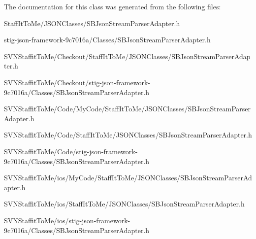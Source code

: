 \-The documentation for this class was generated from the following files\-:\begin{DoxyCompactItemize}
\item 
\-Staff\-It\-To\-Me/\-J\-S\-O\-N\-Classes/\-S\-B\-Json\-Stream\-Parser\-Adapter.\-h\item 
stig-\/json-\/framework-\/9c7016a/\-Classes/\-S\-B\-Json\-Stream\-Parser\-Adapter.\-h\item 
\-S\-V\-N\-Staffit\-To\-Me/\-Checkout/\-Staff\-It\-To\-Me/\-J\-S\-O\-N\-Classes/\-S\-B\-Json\-Stream\-Parser\-Adapter.\-h\item 
\-S\-V\-N\-Staffit\-To\-Me/\-Checkout/stig-\/json-\/framework-\/9c7016a/\-Classes/\-S\-B\-Json\-Stream\-Parser\-Adapter.\-h\item 
\-S\-V\-N\-Staffit\-To\-Me/\-Code/\-My\-Code/\-Staff\-It\-To\-Me/\-J\-S\-O\-N\-Classes/\-S\-B\-Json\-Stream\-Parser\-Adapter.\-h\item 
\-S\-V\-N\-Staffit\-To\-Me/\-Code/\-Staff\-It\-To\-Me/\-J\-S\-O\-N\-Classes/\-S\-B\-Json\-Stream\-Parser\-Adapter.\-h\item 
\-S\-V\-N\-Staffit\-To\-Me/\-Code/stig-\/json-\/framework-\/9c7016a/\-Classes/\-S\-B\-Json\-Stream\-Parser\-Adapter.\-h\item 
\-S\-V\-N\-Staffit\-To\-Me/ios/\-My\-Code/\-Staff\-It\-To\-Me/\-J\-S\-O\-N\-Classes/\-S\-B\-Json\-Stream\-Parser\-Adapter.\-h\item 
\-S\-V\-N\-Staffit\-To\-Me/ios/\-Staff\-It\-To\-Me/\-J\-S\-O\-N\-Classes/\-S\-B\-Json\-Stream\-Parser\-Adapter.\-h\item 
\-S\-V\-N\-Staffit\-To\-Me/ios/stig-\/json-\/framework-\/9c7016a/\-Classes/\-S\-B\-Json\-Stream\-Parser\-Adapter.\-h\end{DoxyCompactItemize}
